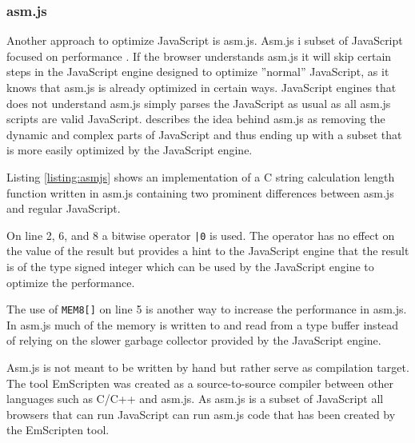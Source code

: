 
\subsubsection{asm.js}

Another approach to optimize JavaScript is asm.js. Asm.js i subset of JavaScript focused on performance \parencite{Zakai2018}. If the browser understands asm.js it will skip certain steps in the JavaScript engine designed to optimize ''normal'' JavaScript, as it knows that asm.js is already optimized in certain ways. JavaScript engines that does not understand asm.js simply parses the JavaScript as usual as all asm.js scripts are valid JavaScript. \textcite{Zakai2018} describes the idea behind asm.js as removing the dynamic and complex parts of JavaScript and thus ending up with a subset that is more easily optimized by the JavaScript engine.


%

Listing \ref{listing:asmjs} shows an implementation of a C string calculation length function written in asm.js containing two prominent differences between asm.js and regular JavaScript. 

On line 2, 6, and 8 a bitwise operator \texttt{|0} is used. The operator has no effect on the value of the result but provides a hint to the JavaScript engine that the result is of the type signed integer which can be used by the JavaScript engine to optimize the performance. 

The use of \texttt{MEM8[]} on line 5 is another way to increase the performance in asm.js. In asm.js much of the memory is written to and read from a type buffer instead of relying on the slower garbage collector provided by the JavaScript engine.

Asm.js is not meant to be written by hand but rather serve as compilation target. The tool EmScripten \parencite{Zakai2011} was created as a source-to-source compiler between other languages such as C/C++ and asm.js. As asm.js is a subset of JavaScript all browsers that can run JavaScript can run asm.js code that has been created by the EmScripten tool.

